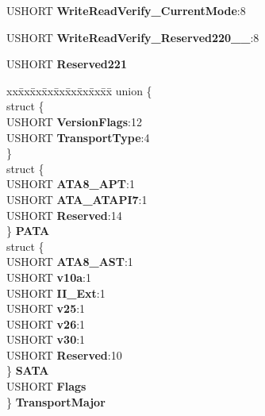 \begin{DoxyCompactItemize}
U\+S\+H\+O\+RT {\bfseries Write\+Read\+Verify\+\_\+\+Current\+Mode}\+:8
\item 
\mbox{\label{struct___i_d_e_n_t_i_f_y___d_a_t_a_a8679d1774994b2747565e23237565681}} 
U\+S\+H\+O\+RT {\bfseries Write\+Read\+Verify\+\_\+\+Reserved220\+\_\+\_}\+:8
\item 
\mbox{\label{struct___i_d_e_n_t_i_f_y___d_a_t_a_abdbd5142ce08ae85810dd9a1231db6db}} 
U\+S\+H\+O\+RT {\bfseries Reserved221}
\item 
\mbox{\label{struct___i_d_e_n_t_i_f_y___d_a_t_a_a127cee2fb5465a0969e0bf2b6f8660c5}} 
\begin{tabbing}
xx\=xx\=xx\=xx\=xx\=xx\=xx\=xx\=xx\=\kill
union \{\\
\mbox{\label{union___i_d_e_n_t_i_f_y___d_a_t_a_1_1_0D969_a13d4075ee70e773e75de4d8592321f37}} 
\>struct \{\\
\>\>USHORT {\bfseries VersionFlags}:12\\
\>\>USHORT {\bfseries TransportType}:4\\
\>\} \\
\>struct \{\\
\>\>USHORT {\bfseries ATA8\_APT}:1\\
\>\>USHORT {\bfseries ATA\_ATAPI7}:1\\
\>\>USHORT {\bfseries Reserved}:14\\
\>\} {\bfseries PATA}\\
\>struct \{\\
\>\>USHORT {\bfseries ATA8\_AST}:1\\
\>\>USHORT {\bfseries v10a}:1\\
\>\>USHORT {\bfseries II\_Ext}:1\\
\>\>USHORT {\bfseries v25}:1\\
\>\>USHORT {\bfseries v26}:1\\
\>\>USHORT {\bfseries v30}:1\\
\>\>USHORT {\bfseries Reserved}:10\\
\>\} {\bfseries SATA}\\
\>USHORT {\bfseries Flags}\\
\} {\bfseries TransportMajor}\\


\end{tabbing}
\end{DoxyCompactItemize}
